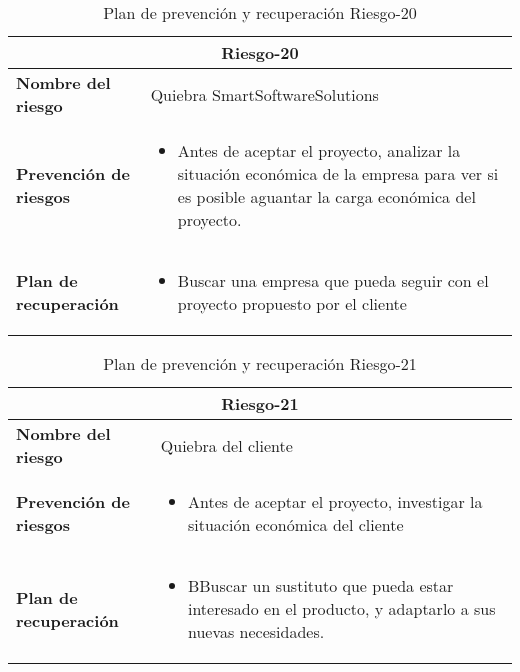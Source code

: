 \begin{table}[H]
\begin{center}
\begin{tabular}{p{} p{10cm}}
\multicolumn{2}{c}{\textbf{Riesgo-20} } \\
\hline \hline
\textbf{Nombre del riesgo} & Quiebra SmartSoftwareSolutions \\
\hline
\textbf{Prevención de riesgos} & \begin{itemize}[-]
  \item Antes de aceptar el proyecto, analizar la situación económica de la empresa para ver si es posible aguantar la carga económica del proyecto.
  \end{itemize} \\
\hline
\textbf{Plan de recuperación} &   \begin{itemize}[-]
  \item Buscar una empresa que pueda seguir con el proyecto propuesto por el cliente
  \end{itemize}\\
\hline
\end{tabular}
\caption{Plan de prevención y recuperación Riesgo-20}
\label{tab:Riesgo-20-Prev_Recup}
\end{center}
\end{table}

\begin{table}[H]
\begin{center}
\begin{tabular}{p{} p{10cm}}
\multicolumn{2}{c}{\textbf{Riesgo-21} } \\
\hline \hline
\textbf{Nombre del riesgo} & Quiebra del cliente \\
\hline
\textbf{Prevención de riesgos} & \begin{itemize}[-]
  \item Antes de aceptar el proyecto, investigar la situación económica del cliente
  \end{itemize} \\
\hline
\textbf{Plan de recuperación} &   \begin{itemize}[-]
  \item BBuscar un sustituto que pueda estar interesado en el producto, y adaptarlo a sus nuevas necesidades.
  \end{itemize}\\
\hline
\end{tabular}
\caption{Plan de prevención y recuperación Riesgo-21}
\label{tab:Riesgo-21-Prev_Recup}
\end{center}
\end{table}

